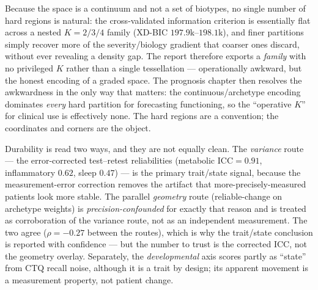 \begin{openbox}
Because the space is a continuum and not a set of biotypes, no single number of hard regions is natural:
the cross-validated information criterion is essentially flat across a nested $K=2/3/4$ family
(XD-BIC $197.9$k--$198.1$k), and finer partitions simply recover more of the severity/biology gradient that
coarser ones discard, without ever revealing a density gap. The report therefore exports a \emph{family}
with no privileged $K$ rather than a single tessellation --- operationally awkward, but the honest encoding
of a graded space. The prognosis chapter then resolves the awkwardness in the only way that matters: the
continuous/archetype encoding dominates \emph{every} hard partition for forecasting functioning, so the
``operative $K$'' for clinical use is effectively none. The hard regions are a convention; the coordinates
and corners are the object.
\end{openbox}

\begin{openbox}
Durability is read two ways, and they are not equally clean. The \emph{variance} route --- the
error-corrected test--retest reliabilities (metabolic $\text{ICC}=0.91$, inflammatory $0.62$, sleep
$0.47$) --- is the primary trait/state signal, because the measurement-error correction removes the
artifact that more-precisely-measured patients look more stable. The parallel \emph{geometry} route
(reliable-change on archetype weights) is \emph{precision-confounded} for exactly that reason and is
treated as corroboration of the variance route, not as an independent measurement. The two agree
($\rho=-0.27$ between the routes), which is why the trait/state conclusion is reported with confidence ---
but the number to trust is the corrected ICC, not the geometry overlay. Separately, the
\emph{developmental} axis scores partly as ``state'' from CTQ recall noise, although it is a trait by
design; its apparent movement is a measurement property, not patient change.
\end{openbox}

